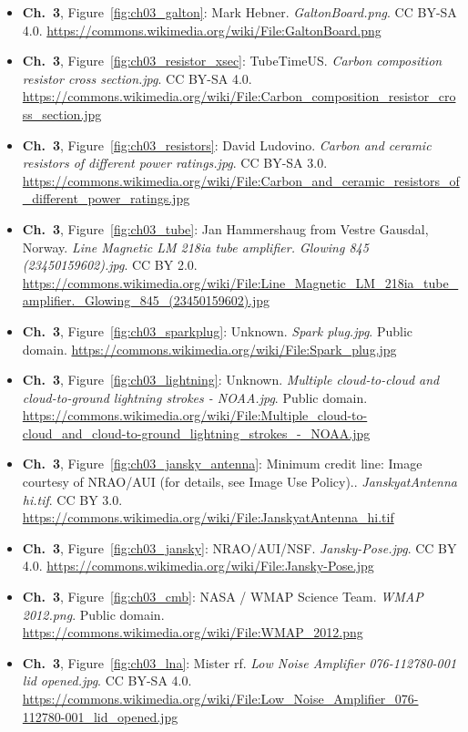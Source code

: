 \begin{small}
\begin{itemize}[leftmargin=0pt,itemsep=2pt,label={}]
\item \textbf{Ch.~3}, Figure~\ref{fig:ch03_galton}: Mark Hebner. \emph{GaltonBoard.\allowbreak{}png}. CC BY-SA 4.0. \url{https://commons.wikimedia.org/wiki/File:GaltonBoard.png}
\item \textbf{Ch.~3}, Figure~\ref{fig:ch03_resistor_xsec}: TubeTimeUS. \emph{Carbon composition resistor cross section.\allowbreak{}jpg}. CC BY-SA 4.0. \url{https://commons.wikimedia.org/wiki/File:Carbon_composition_resistor_cross_section.jpg}
\item \textbf{Ch.~3}, Figure~\ref{fig:ch03_resistors}: David Ludovino. \emph{Carbon and ceramic resistors of different power ratings.\allowbreak{}jpg}. CC BY-SA 3.0. \url{https://commons.wikimedia.org/wiki/File:Carbon_and_ceramic_resistors_of_different_power_ratings.jpg}
\item \textbf{Ch.~3}, Figure~\ref{fig:ch03_tube}: Jan Hammershaug from Vestre Gausdal, Norway. \emph{Line Magnetic LM 218ia tube amplifier.\allowbreak{} Glowing 845 (23450159602).\allowbreak{}jpg}. CC BY 2.0. \url{https://commons.wikimedia.org/wiki/File:Line_Magnetic_LM_218ia_tube_amplifier._Glowing_845_(23450159602).jpg}
\item \textbf{Ch.~3}, Figure~\ref{fig:ch03_sparkplug}: Unknown. \emph{Spark plug.\allowbreak{}jpg}. Public domain. \url{https://commons.wikimedia.org/wiki/File:Spark_plug.jpg}
\item \textbf{Ch.~3}, Figure~\ref{fig:ch03_lightning}: Unknown. \emph{Multiple cloud-\allowbreak{}to-\allowbreak{}cloud and cloud-\allowbreak{}to-\allowbreak{}ground lightning strokes -\allowbreak{} NOAA.\allowbreak{}jpg}. Public domain. \url{https://commons.wikimedia.org/wiki/File:Multiple_cloud-to-cloud_and_cloud-to-ground_lightning_strokes_-_NOAA.jpg}
\item \textbf{Ch.~3}, Figure~\ref{fig:ch03_jansky_antenna}: Minimum credit line: Image courtesy of NRAO/AUI (for details, see Image Use Policy).. \emph{JanskyatAntenna hi.\allowbreak{}tif}. CC BY 3.0. \url{https://commons.wikimedia.org/wiki/File:JanskyatAntenna_hi.tif}
\item \textbf{Ch.~3}, Figure~\ref{fig:ch03_jansky}: NRAO/AUI/NSF. \emph{Jansky-\allowbreak{}Pose.\allowbreak{}jpg}. CC BY 4.0. \url{https://commons.wikimedia.org/wiki/File:Jansky-Pose.jpg}
\item \textbf{Ch.~3}, Figure~\ref{fig:ch03_cmb}: NASA / WMAP Science Team. \emph{WMAP 2012.\allowbreak{}png}. Public domain. \url{https://commons.wikimedia.org/wiki/File:WMAP_2012.png}
\item \textbf{Ch.~3}, Figure~\ref{fig:ch03_lna}: Mister rf. \emph{Low Noise Amplifier 076-\allowbreak{}112780-\allowbreak{}001 lid opened.\allowbreak{}jpg}. CC BY-SA 4.0. \url{https://commons.wikimedia.org/wiki/File:Low_Noise_Amplifier_076-112780-001_lid_opened.jpg}

\end{itemize}
\end{small}
